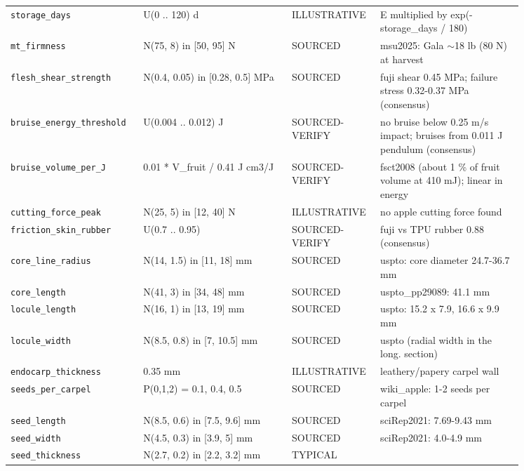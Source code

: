 \documentclass[10.5pt,a4paper]{article}
\begin{document}
{\begin{longtable}{@{}p{0.2\linewidth}p{0.27\linewidth}p{0.12\linewidth}p{0.26\linewidth}@{}}
\texttt{storage\_\allowbreak{}days} & U(0 .. 120) d & ILLUSTRATIVE & E multiplied by exp(-storage\_days / 180) \\
\texttt{mt\_\allowbreak{}firmness} & N(75, 8) in [50, 95] N & SOURCED & msu2025: Gala $\sim$18 lb (80 N) at harvest \\
\texttt{flesh\_\allowbreak{}shear\_\allowbreak{}strength} & N(0.4, 0.05) in [0.28, 0.5] MPa & SOURCED & fuji shear 0.45 MPa; failure stress 0.32-0.37 MPa (consensus) \\
\texttt{bruise\_\allowbreak{}energy\_\allowbreak{}threshold} & U(0.004 .. 0.012) J & SOURCED-VERIFY & no bruise below 0.25 m/s impact; bruises from 0.011 J pendulum (consensus) \\
\texttt{bruise\_\allowbreak{}volume\_\allowbreak{}per\_\allowbreak{}J} & 0.01 * V\_fruit / 0.41 J cm3/J & SOURCED-VERIFY & fsct2008 (about 1 \% of fruit volume at 410 mJ); linear in energy \\
\texttt{cutting\_\allowbreak{}force\_\allowbreak{}peak} & N(25, 5) in [12, 40] N & ILLUSTRATIVE & no apple cutting force found \\
\texttt{friction\_\allowbreak{}skin\_\allowbreak{}rubber} & U(0.7 .. 0.95) & SOURCED-VERIFY & fuji vs TPU rubber 0.88 (consensus) \\
\texttt{core\_\allowbreak{}line\_\allowbreak{}radius} & N(14, 1.5) in [11, 18] mm & SOURCED & uspto: core diameter 24.7-36.7 mm \\
\texttt{core\_\allowbreak{}length} & N(41, 3) in [34, 48] mm & SOURCED & uspto\_pp29089: 41.1 mm \\
\texttt{locule\_\allowbreak{}length} & N(16, 1) in [13, 19] mm & SOURCED & uspto: 15.2 x 7.9, 16.6 x 9.9 mm \\
\texttt{locule\_\allowbreak{}width} & N(8.5, 0.8) in [7, 10.5] mm & SOURCED & uspto (radial width in the long. section) \\
\texttt{endocarp\_\allowbreak{}thickness} & 0.35 mm & ILLUSTRATIVE & leathery/papery carpel wall \\
\texttt{seeds\_\allowbreak{}per\_\allowbreak{}carpel} & P(0,1,2) = 0.1, 0.4, 0.5 & SOURCED & wiki\_apple: 1-2 seeds per carpel \\
\texttt{seed\_\allowbreak{}length} & N(8.5, 0.6) in [7.5, 9.6] mm & SOURCED & sciRep2021: 7.69-9.43 mm \\
\texttt{seed\_\allowbreak{}width} & N(4.5, 0.3) in [3.9, 5] mm & SOURCED & sciRep2021: 4.0-4.9 mm \\
\texttt{seed\_\allowbreak{}thickness} & N(2.7, 0.2) in [2.2, 3.2] mm & TYPICAL &  \\

\end{longtable}}
\end{document}
